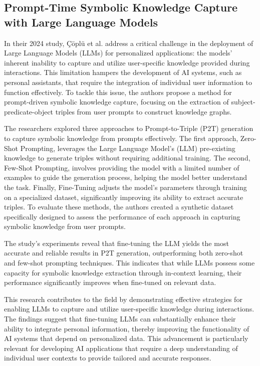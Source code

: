 \subsection{Prompt-Time Symbolic Knowledge Capture with Large Language Models}

\noindent In their 2024 study, Çöplü et al. address a critical challenge in the deployment of Large Language Models (LLMs) for personalized applications: the models' inherent inability to capture and utilize user-specific knowledge provided during interactions. This limitation hampers the development of AI systems, such as personal assistants, that require the integration of individual user information to function effectively. To tackle this issue, the authors propose a method for prompt-driven symbolic knowledge capture, focusing on the extraction of subject-predicate-object triples from user prompts to construct knowledge graphs.

The researchers explored three approaches to Prompt-to-Triple (P2T) generation to capture symbolic knowledge from prompts effectively. The first approach, Zero-Shot Prompting, leverages the Large Language Model's (LLM) pre-existing knowledge to generate triples without requiring additional training. The second, Few-Shot Prompting, involves providing the model with a limited number of examples to guide the generation process, helping the model better understand the task. Finally, Fine-Tuning adjusts the model's parameters through training on a specialized dataset, significantly improving its ability to extract accurate triples. To evaluate these methods, the authors created a synthetic dataset specifically designed to assess the performance of each approach in capturing symbolic knowledge from user prompts.

The study's experiments reveal that fine-tuning the LLM yields the most accurate and reliable results in P2T generation, outperforming both zero-shot and few-shot prompting techniques. This indicates that while LLMs possess some capacity for symbolic knowledge extraction through in-context learning, their performance significantly improves when fine-tuned on relevant data.

This research contributes to the field by demonstrating effective strategies for enabling LLMs to capture and utilize user-specific knowledge during interactions. The findings suggest that fine-tuning LLMs can substantially enhance their ability to integrate personal information, thereby improving the functionality of AI systems that depend on personalized data. This advancement is particularly relevant for developing AI applications that require a deep understanding of individual user contexts to provide tailored and accurate responses.

